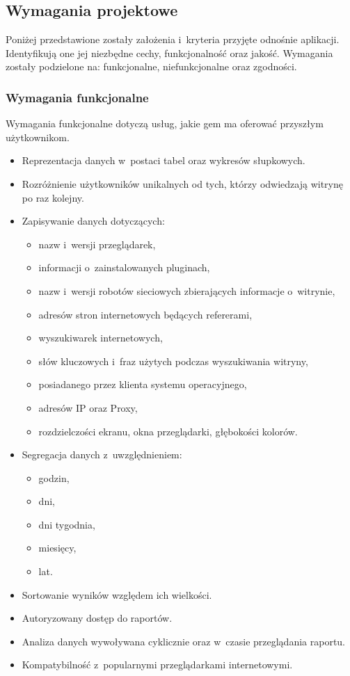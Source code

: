 \subsection{Wymagania projektowe}
Poniżej przedstawione zostały założenia i~kryteria przyjęte odnośnie aplikacji. Identyfikują one jej niezbędne cechy, funkcjonalność oraz jakość. Wymagania zostały podzielone na: funkcjonalne, niefunkcjonalne oraz zgodności.

\subsubsection{Wymagania funkcjonalne}
Wymagania funkcjonalne dotyczą usług, jakie gem ma oferować przyszłym użytkownikom.

\begin{itemize}
  \item Reprezentacja danych w~postaci tabel oraz wykresów słupkowych.
  \item Rozróżnienie użytkowników unikalnych od tych, którzy odwiedzają witrynę po raz kolejny.
  \item Zapisywanie danych dotyczących:
    \begin{itemize}
      \item nazw i~wersji przeglądarek,
      \item informacji o~zainstalowanych pluginach,
      \item nazw i~wersji robotów sieciowych zbierających informacje o~witrynie,
      \item adresów stron internetowych będących refererami,
      \item wyszukiwarek internetowych,
      \item słów kluczowych i~fraz użytych podczas wyszukiwania witryny,
      \item posiadanego przez klienta systemu operacyjnego,
      \item adresów IP oraz Proxy,
      \item rozdzielczości ekranu, okna przeglądarki, głębokości kolorów.
  \end{itemize}
  \item Segregacja danych z~uwzględnieniem:
    \begin{itemize}
      \item godzin,
      \item dni,
      \item dni tygodnia,
      \item miesięcy,
      \item lat.
    \end{itemize}
  \item Sortowanie wyników względem ich wielkości.
  \item Autoryzowany dostęp do raportów.
  \item Analiza danych wywoływana cyklicznie oraz w~czasie przeglądania raportu.
  \item Kompatybilność z~popularnymi przeglądarkami internetowymi.


\end{itemize}
